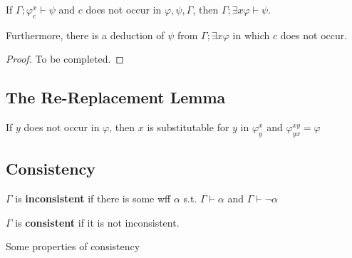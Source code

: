 \begin{corollary}[Rule El]
    If $\Gamma;\varphi_c^x\vdash\psi$ and $c$ does not occur in $\varphi,\psi,\Gamma$, then $\Gamma;\exists x \varphi\vdash\psi$.
    
    Furthermore, there is a deduction of $\psi$ from $\Gamma;\exists x \varphi$ in which $c$ does not occur.
\end{corollary}
\begin{proof}
    To be completed.
\end{proof}

\subsection{The Re-Replacement Lemma}

\begin{lemma}
    \label{lem:ReReplacementLemma}
    If $y$ does not occur in $\varphi$, then $x$ is substitutable for $y$ in $\varphi_y^x$ and $\varphi_{yx}^{xy} = \varphi$
\end{lemma}

\subsection{Consistency}

\begin{definition}[Consistency]
    $\Gamma$ is \textbf{inconsistent} if there is some wff $\alpha$ s.t. $\Gamma\vdash\alpha$ and $\Gamma\vdash\neg\alpha$

    $\Gamma$ is \textbf{consistent} if it is not inconsistent.
\end{definition}

Some properties of consistency

